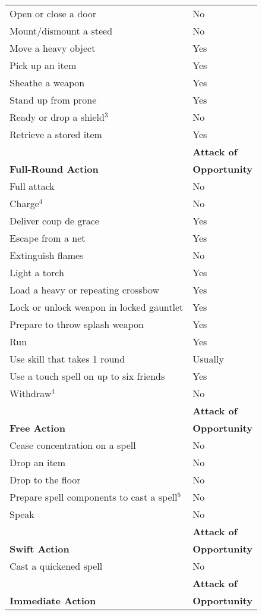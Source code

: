 \begin{table}[]
\begin{tabular}{ll}
Open or close a door & No\\
Mount/dismount a steed & No\\
Move a heavy object & Yes\\
Pick up an item & Yes\\
Sheathe a weapon & Yes\\
Stand up from prone & Yes\\
Ready or drop a shield\(^{3}\) & No\\
Retrieve a stored item & Yes\\
                         & \textbf{Attack of}\\
\textbf{Full-Round Action} & \textbf{Opportunity}\\
Full attack & No\\
Charge\(^{4}\) & No\\
Deliver coup de grace & Yes\\
Escape from a net & Yes\\
Extinguish flames & No\\
Light a torch & Yes\\
Load a heavy or repeating crossbow & Yes\\
Lock or unlock weapon in locked gauntlet & Yes\\
Prepare to throw splash weapon & Yes\\
Run & Yes\\
Use skill that takes 1 round & Usually\\
Use a touch spell on up to six friends & Yes\\
Withdraw\(^{4}\) & No\\
                         & \textbf{Attack of}\\
\textbf{Free Action} & \textbf{Opportunity}\\
Cease concentration on a spell & No\\
Drop an item & No\\
Drop to the floor & No\\
Prepare spell components to cast a spell\(^{5}\) & No\\
Speak & No\\
                         & \textbf{Attack of}\\
\textbf{Swift Action} & \textbf{Opportunity}\\
Cast a quickened spell & No\\
                         & \textbf{Attack of}\\
\textbf{Immediate Action} & \textbf{Opportunity}\\

\end{tabular}
\end{table}
